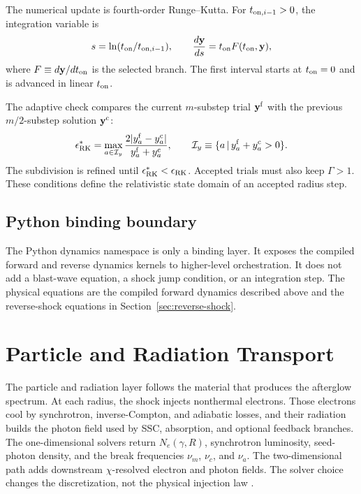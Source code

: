 \documentclass[twocolumn]{aastex702}
\begin{document}
The numerical update is fourth-order Runge--Kutta.  For
\(t_{{\rm on},i-1}>0\), the integration variable is
\begin{equation}
s=\ln(t_{\rm on}/t_{{\rm on},i-1}),\qquad
\frac{d\mathbf{y}}{ds}
=t_{\rm on}F(t_{\rm on},\mathbf{y}),
\end{equation}
where \(F\equiv d\mathbf{y}/dt_{\rm on}\) is the selected branch.  The first
interval starts at \(t_{\rm on}=0\) and is advanced in linear \(t_{\rm on}\).

The adaptive check compares the current \(m\)-substep trial
\(\mathbf{y}^{\rm f}\) with the previous \(m/2\)-substep solution
\(\mathbf{y}^{\rm c}\):
\begin{equation}
\epsilon_{\rm RK}^\ast=
\max_{a\in\mathcal{I}_y}
\frac{2|y_a^{\rm f}-y_a^{\rm c}|}
{y_a^{\rm f}+y_a^{\rm c}},
\qquad
\mathcal{I}_y\equiv\{a\,|\,y_a^{\rm f}+y_a^{\rm c}>0\}.
\end{equation}
The subdivision is refined until \(\epsilon_{\rm RK}^\ast<\epsilon_{\rm RK}\).
Accepted trials must also keep \(\Gamma>1\).  These conditions define the
relativistic state domain of an accepted radius step.

\subsection{Python binding boundary}

The Python dynamics namespace is only a binding layer.  It exposes the compiled
forward and reverse dynamics kernels to higher-level orchestration.  It does not
add a blast-wave equation, a shock jump condition, or an integration step.  The
physical equations are the compiled forward dynamics described above and the
reverse-shock equations in Section~\ref{sec:reverse-shock}.

\section{Particle and Radiation Transport} \label{sec:electron}

The particle and radiation layer follows the material that produces the
afterglow spectrum.  At each radius, the shock injects nonthermal electrons.
Those electrons cool by synchrotron, inverse-Compton, and adiabatic losses, and
their radiation builds the photon field used by SSC, absorption, and optional
feedback branches.  The one-dimensional solvers return \(N_e(\gamma,R)\),
synchrotron luminosity, seed-photon density, and the break frequencies
\(\nu_m\), \(\nu_c\), and \(\nu_a\).  The two-dimensional path adds downstream
\(\chi\)-resolved electron and photon fields.  The solver choice changes the
discretization, not the physical injection law
\citep{LeVeque2002,JiangShu1996,HesthavenWarburton2008}.
\end{document}
